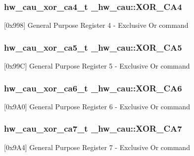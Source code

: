 \subsubsection[{\texorpdfstring{X\+O\+R\+\_\+\+C\+A4}{XOR_CA4}}]{ {\bf hw\+\_\+cau\+\_\+xor\+\_\+ca4\+\_\+t} \+\_\+hw\+\_\+cau\+::\+X\+O\+R\+\_\+\+C\+A4}\hypertarget{struct__hw__cau_a688cd8dda6205d518563d3adbd3c1a48}{}\label{struct__hw__cau_a688cd8dda6205d518563d3adbd3c1a48}
\mbox{[}0x998\mbox{]} General Purpose Register 4 -\/ Exclusive Or command 
\subsubsection[{\texorpdfstring{X\+O\+R\+\_\+\+C\+A5}{XOR_CA5}}]{ {\bf hw\+\_\+cau\+\_\+xor\+\_\+ca5\+\_\+t} \+\_\+hw\+\_\+cau\+::\+X\+O\+R\+\_\+\+C\+A5}\hypertarget{struct__hw__cau_a163e87e4d0e0297ac83b35262ff82be6}{}\label{struct__hw__cau_a163e87e4d0e0297ac83b35262ff82be6}
\mbox{[}0x99C\mbox{]} General Purpose Register 5 -\/ Exclusive Or command 
\subsubsection[{\texorpdfstring{X\+O\+R\+\_\+\+C\+A6}{XOR_CA6}}]{ {\bf hw\+\_\+cau\+\_\+xor\+\_\+ca6\+\_\+t} \+\_\+hw\+\_\+cau\+::\+X\+O\+R\+\_\+\+C\+A6}\hypertarget{struct__hw__cau_a99e17ae449c74c9c99772422a350559c}{}\label{struct__hw__cau_a99e17ae449c74c9c99772422a350559c}
\mbox{[}0x9\+A0\mbox{]} General Purpose Register 6 -\/ Exclusive Or command 
\subsubsection[{\texorpdfstring{X\+O\+R\+\_\+\+C\+A7}{XOR_CA7}}]{ {\bf hw\+\_\+cau\+\_\+xor\+\_\+ca7\+\_\+t} \+\_\+hw\+\_\+cau\+::\+X\+O\+R\+\_\+\+C\+A7}\hypertarget{struct__hw__cau_a62d92f2d73b1baad112666dfa25a74a8}{}\label{struct__hw__cau_a62d92f2d73b1baad112666dfa25a74a8}
\mbox{[}0x9\+A4\mbox{]} General Purpose Register 7 -\/ Exclusive Or command 
